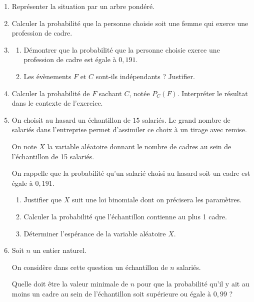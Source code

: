 \documentclass[10pt]{article}
\begin{document}
\begin{enumerate}
\item Représenter la situation par un arbre pondéré.
\item Calculer la probabilité que la personne choisie soit une femme qui exerce une profession de cadre.
\item 
	\begin{enumerate}
		\item Démontrer que la probabilité que la personne choisie exerce une profession de cadre est égale à $0,191$.
		\item Les évènements $F$ et $C$ sont-ils indépendants ? Justifier.
	\end{enumerate}	
\item Calculer la probabilité de $F$ sachant $C$, notée $P_C(F)$. Interpréter le résultat dans le
contexte de l'exercice.
\item On choisit au hasard un échantillon de $15$ salariés. Le grand nombre de salariés
dans l'entreprise permet d'assimiler ce choix à un tirage avec remise. 

On note $X$ la variable aléatoire donnant le nombre de cadres au sein de
l'échantillon de 15 salariés.

On rappelle que la probabilité qu'un salarié choisi au hasard soit un cadre est
égale à $0,191$.
	\begin{enumerate}
		\item Justifier que $X$ suit une loi binomiale dont on précisera les paramètres. 
		\item Calculer la probabilité que l'échantillon contienne au plus 1 cadre.
		\item Déterminer l'espérance de la variable aléatoire $X$.
	\end{enumerate}	
\item Soit $n$ un entier naturel.

On considère dans cette question un échantillon de $n$ salariés.

Quelle doit être la valeur minimale de $n$ pour que la probabilité qu'il y ait au moins un cadre au sein de l'échantillon soit supérieure ou égale à $0,99$ ?
\end{enumerate}

\bigskip
\end{document}
